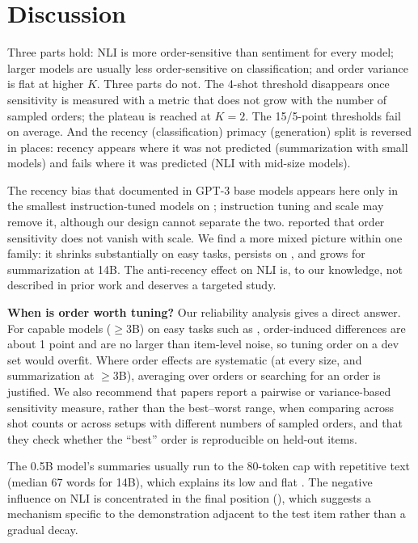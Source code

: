 \section{Discussion}
\label{sec:discussion}

Three parts hold: NLI is more order-sensitive than sentiment for every model; larger models are usually less order-sensitive on classification; and order variance is flat at higher $K$.
Three parts do not.
The 4-shot threshold disappears once sensitivity is measured with a metric that does not grow with the number of sampled orders; the plateau is reached at $K=2$.
The 15/5-point thresholds fail on average.
And the recency (classification) \vsx primacy (generation) split is reversed in places: recency appears where it was not predicted (summarization with small models) and fails where it was predicted (NLI with mid-size models).

The recency bias that \citet{zhao2021calibrate} documented in GPT-3 base models appears here only in the smallest instruction-tuned models on \sst; instruction tuning and scale may remove it, although our design cannot separate the two.
\citet{lu2022fantastically} reported that order sensitivity does not vanish with scale.
We find a more mixed picture within one family: it shrinks substantially on easy tasks, persists on \mnli, and grows for summarization at 14B.
The anti-recency effect on NLI is, to our knowledge, not described in prior work and deserves a targeted study.

{\bf When is order worth tuning?}
Our reliability analysis gives a direct answer.
For capable models ($\geq$3B) on easy tasks such as \sst, order-induced differences are about 1 point and are no larger than item-level noise, so tuning order on a dev set would overfit.
Where order effects are systematic (\mnli at every size, and summarization at $\geq$3B), averaging over orders or searching for an order is justified.
We also recommend that papers report a pairwise or variance-based sensitivity measure, rather than the best--worst range, when comparing across shot counts or across setups with different numbers of sampled orders, and that they check whether the ``best'' order is reproducible on held-out items.

The 0.5B model's summaries usually run to the 80-token cap with repetitive text (median 67 words  for 14B), which explains its low and flat \rougel.
The negative influence on NLI is concentrated in the final position (), which suggests a mechanism specific to the demonstration adjacent to the test item rather than a gradual decay.

